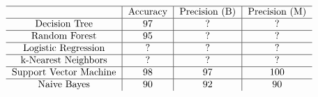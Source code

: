 \documentclass[conference]{IEEEtran}
\begin{document}
\begin{table}[h]
    \centering
    \caption{\\Algorithm Analysis for Testing Data ({\textbf After Fine-tuning})}
    $\begin{tabular}{c|c|c|c}
        \hline
        & Accuracy & Precision (B) & Precision (M)\\
        \hline
        Decision Tree & 97 & ? & ? \\
        \hline
        Random Forest & 95 & ? & ?\\
        \hline
        Logistic Regression & ? & ? & ? \\
        \hline
        k-Nearest Neighbors & ? & ? & ?\\
        \hline
        Support Vector Machine & 98 & 97 & 100 \\
        \hline
        Naive Bayes & 90 & 92 & 90\\
    \end{tabular}$

\end{table}
\end{document}
